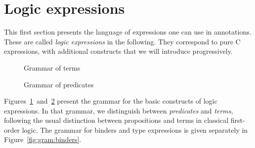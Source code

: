 
\section{Logic expressions}
\label{sec:expressions}

This first section presents the language of expressions one can use in
annotations. These are called \emph{logic expressions} in the following. They
correspond to pure C expressions, with additional constructs
that we will introduce progressively.

\begin{figure}[t]
  \begin{cadre}
    
  \end{cadre}
  \caption{Grammar of terms}
\label{fig:gram:term}
\end{figure}

\begin{figure}[hb]
  \begin{cadre}
    
  \end{cadre}
  \caption{Grammar of predicates}
\label{fig:gram:pred}
\end{figure}

Figures~\ref{fig:gram:term}~and~\ref{fig:gram:pred} present the
grammar for the basic constructs of logic expressions. In that
grammar, we distinguish between \emph{predicates} and
\emph{terms}, following the usual distinction between
propositions and terms in classical first-order logic. The grammar
for binders and type expressions is given separately in
Figure~\ref{fig:gram:binders}.

